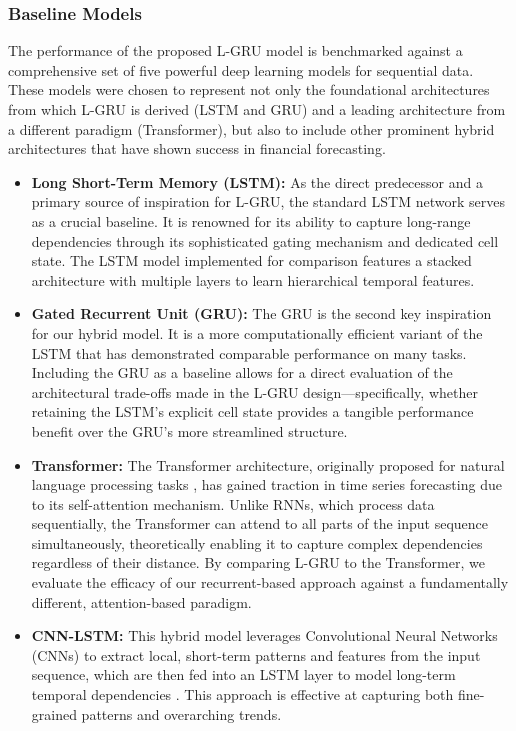 \documentclass{cys}
\begin{document}
\begin{enumerate}
    \subsubsection{Baseline Models}
    
    The performance of the proposed L-GRU model is benchmarked against a comprehensive set of five powerful deep learning models for sequential data. These models were chosen to represent not only the foundational architectures from which L-GRU is derived (LSTM and GRU) and a leading architecture from a different paradigm (Transformer), but also to include other prominent hybrid architectures that have shown success in financial forecasting.
    \begin{itemize}
        \item \textbf{Long Short-Term Memory (LSTM):}
        As the direct predecessor and a primary source of inspiration for L-GRU, the standard LSTM network \cite{hochreiter1997long} serves as a crucial baseline. It is renowned for its ability to capture long-range dependencies through its sophisticated gating mechanism and dedicated cell state. The LSTM model implemented for comparison features a stacked architecture with multiple layers to learn hierarchical temporal features.
        \item \textbf{Gated Recurrent Unit (GRU):}
        The GRU \cite{cho2014learning} is the second key inspiration for our hybrid model. It is a more computationally efficient variant of the LSTM that has demonstrated comparable performance on many tasks. Including the GRU as a baseline allows for a direct evaluation of the architectural trade-offs made in the L-GRU design—specifically, whether retaining the LSTM's explicit cell state provides a tangible performance benefit over the GRU's more streamlined structure.
        \item \textbf{Transformer:}
        The Transformer architecture, originally proposed for natural language processing tasks \cite{vaswani2017attention}, has gained traction in time series forecasting due to its self-attention mechanism. Unlike RNNs, which process data sequentially, the Transformer can attend to all parts of the input sequence simultaneously, theoretically enabling it to capture complex dependencies regardless of their distance. By comparing L-GRU to the Transformer, we evaluate the efficacy of our recurrent-based approach against a fundamentally different, attention-based paradigm.
        \item \textbf{CNN-LSTM:}
        This hybrid model leverages Convolutional Neural Networks (CNNs) to extract local, short-term patterns and features from the input sequence, which are then fed into an LSTM layer to model long-term temporal dependencies \cite{hoseinzade2019cnn}. This approach is effective at capturing both fine-grained patterns and overarching trends.

\end{itemize}
\end{enumerate}
\end{document}
